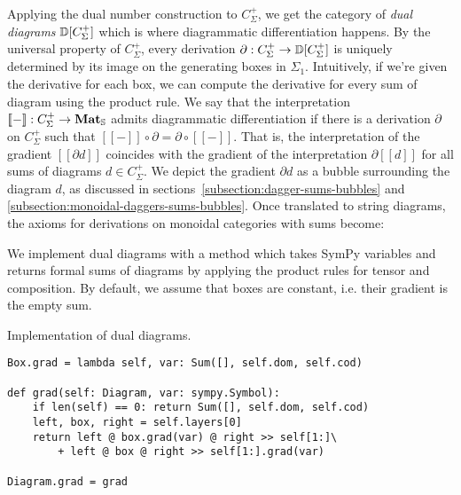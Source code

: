 Applying the dual number construction to $C_\Sigma^+$, we get the category of \emph{dual diagrams} $\D[C_\Sigma^+]$ which is where diagrammatic differentiation happens.
By the universal property of $C_\Sigma^+$, every derivation $\partial : C_\Sigma^+ \to \D[C_\Sigma^+]$ is uniquely determined by its image on the generating boxes in $\Sigma_1$.
Intuitively, if we're given the derivative for each box, we can compute the derivative for every sum of diagram using the product rule.
We say that the interpretation $[\![-]\!] : C_\Sigma^+ \to \mathbf{Mat}_\S$ admits diagrammatic differentiation if there is a derivation $\partial$ on $C_\Sigma^+$ such that $[\![-]\!] \circ \partial = \partial \circ [\![-]\!]$.
That is, the interpretation of the gradient $[\![\partial d]\!]$ coincides with the gradient of the interpretation $\partial [\![d]\!]$ for all sums of diagrams $d \in C_\Sigma^+$.
We depict the gradient $\partial d$ as a bubble surrounding the diagram $d$, as discussed in sections~\ref{subsection:dagger-sums-bubbles} and \ref{subsection:monoidal-daggers-sums-bubbles}.
Once translated to string diagrams, the axioms for derivations on monoidal
categories with sums become:

We implement dual diagrams with a method  which takes SymPy variables and returns formal sums of diagrams by applying the product rules for tensor and composition.
By default, we assume that boxes are constant, i.e. their gradient is the empty sum.

\begin{python}
{\normalfont Implementation of dual diagrams.}

\begin{verbatim}
Box.grad = lambda self, var: Sum([], self.dom, self.cod)

def grad(self: Diagram, var: sympy.Symbol):
    if len(self) == 0: return Sum([], self.dom, self.cod)
    left, box, right = self.layers[0]
    return left @ box.grad(var) @ right >> self[1:]\
        + left @ box @ right >> self[1:].grad(var)

Diagram.grad = grad
\end{verbatim}
\end{python}

